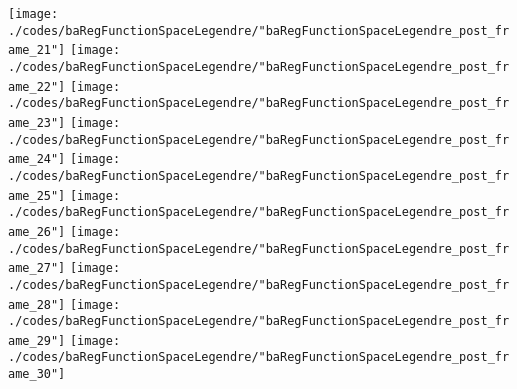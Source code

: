 \begin{frame}{\insertsection}
\begin{center}
{\begin{animateinline}{15}
				 \texttt{[image: ./codes/baRegFunctionSpaceLegendre/"baRegFunctionSpaceLegendre\_post\_frame\_21"]}\newframe
				 \texttt{[image: ./codes/baRegFunctionSpaceLegendre/"baRegFunctionSpaceLegendre\_post\_frame\_22"]}\newframe
				 \texttt{[image: ./codes/baRegFunctionSpaceLegendre/"baRegFunctionSpaceLegendre\_post\_frame\_23"]}\newframe
				 \texttt{[image: ./codes/baRegFunctionSpaceLegendre/"baRegFunctionSpaceLegendre\_post\_frame\_24"]}\newframe
				 \texttt{[image: ./codes/baRegFunctionSpaceLegendre/"baRegFunctionSpaceLegendre\_post\_frame\_25"]}\newframe
				 \texttt{[image: ./codes/baRegFunctionSpaceLegendre/"baRegFunctionSpaceLegendre\_post\_frame\_26"]}\newframe
				 \texttt{[image: ./codes/baRegFunctionSpaceLegendre/"baRegFunctionSpaceLegendre\_post\_frame\_27"]}\newframe
				 \texttt{[image: ./codes/baRegFunctionSpaceLegendre/"baRegFunctionSpaceLegendre\_post\_frame\_28"]}\newframe
				 \texttt{[image: ./codes/baRegFunctionSpaceLegendre/"baRegFunctionSpaceLegendre\_post\_frame\_29"]}\newframe
				 \texttt{[image: ./codes/baRegFunctionSpaceLegendre/"baRegFunctionSpaceLegendre\_post\_frame\_30"]}
			 \end{animateinline}
			}
	\end{center}
    
\end{frame}


